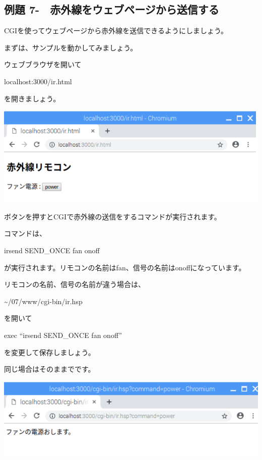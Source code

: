 \documentclass[a4paper,12pt,dvipdfmx]{jarticle}
\newcounter{Exercise}
\renewcommand\theExercise{例題 7-\arabic{Exercise}}
\begin{document}
\clearpage\subsection*{\theExercise　赤外線をウェブページから送信する}
\addtocounter{Exercise}{-1}\label{E:IR}
CGIを使ってウェブページから赤外線を送信できるようにしましょう。

まずは、サンプルを動かしてみましょう。

ウェブブラウザを開いて

localhost:3000/ir.html

を開きましょう。

%
%


\centering
\includegraphics[width=17.006cm]{ome7-img061.png}
\flushleft

ボタンを押すとCGIで赤外線の送信をするコマンドが実行されます。

コマンドは、

irsend SEND\_ONCE fan onoff

が実行されます。リモコンの名前はfan、信号の名前はonoffになっています。

リモコンの名前、信号の名前が違う場合は、

{\textasciitilde}/07/www/cgi-bin/ir.hsp

を開いて

exec “irsend SEND\_ONCE fan onoff”

を変更して保存しましょう。

同じ場合はそのままでです。

%


\centering
\includegraphics[width=16.671cm]{ome7-img062.png}
\flushleft
\end{document}
